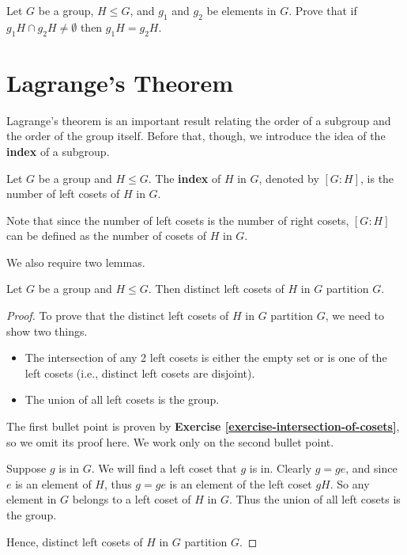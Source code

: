 \begin{exercise}\label{exercise-intersection-of-cosets}
    Let $G$ be a group, $H \leq G$, and $g_1$ and $g_2$ be elements in $G$. Prove that if $g_1H \cap g_2H \neq \emptyset$ then $g_1H = g_2H$.
\end{exercise}

\section{Lagrange's Theorem}
Lagrange's theorem is an important result relating the order of a subgroup and the order of the group itself. Before that, though, we introduce the idea of the \textbf{index} of a subgroup.
\begin{definition}
    Let $G$ be a group and $H \leq G$. The \textbf{index} of $H$ in $G$, denoted by $[G : H]$, is the number of left cosets of $H$ in $G$.
\end{definition}
Note that since the number of left cosets is the number of right cosets, $[G : H]$ can be defined as the number of cosets of $H$ in $G$.

We also require two lemmas.
\begin{lemma}\label{lemma-left-coset-partition}
    Let $G$ be a group and $H \leq G$. Then distinct left cosets of $H$ in $G$ partition $G$.
\end{lemma}
\begin{proof}
    To prove that the distinct left cosets of $H$ in $G$ partition $G$, we need to show two things.
    \begin{itemize}
        \item The intersection of any 2 left cosets is either the empty set or is one of the left cosets (i.e., distinct left cosets are disjoint).
        \item The union of all left cosets is the group.
    \end{itemize}
    The first bullet point is proven by \textbf{Exercise \ref{exercise-intersection-of-cosets}}, so we omit its proof here. We work only on the second bullet point.

    Suppose $g$ is in $G$. We will find a left coset that $g$ is in. Clearly $g = ge$, and since $e$ is an element of $H$, thus $g = ge$ is an element of the left coset $gH$. So any element in $G$ belongs to a left coset of $H$ in $G$. Thus the union of all left cosets is the group.

    Hence, distinct left cosets of $H$ in $G$ partition $G$.
\end{proof}

